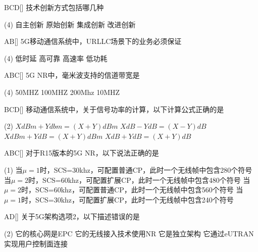 \begin{choice}{\;BCD\;}[]
    技术创新方式包括哪几种
    \begin{tasks}(4)
        \task 自主创新
        \task 原始创新
        \task 集成创新
        \task 改进创新
    \end{tasks}
\end{choice}


\begin{choice}{\;AB\;}[]
    5G移动通信系统中，URLLC场景下的业务必须保证
    \begin{tasks}(4)
        \task 低时延
        \task 高可靠
        \task 高速率
        \task 低功耗
    \end{tasks}
\end{choice}


\begin{choice}{\;ABC\;}[]
    5G NR中，毫米波支持的信道带宽是
    \begin{tasks}(4)
        \task 50MHZ
        \task 100MHZ
        \task 200Mhz
        \task 10MHZ
    \end{tasks}
\end{choice}


\begin{choice}{\;BCD\;}[]
    移动通信系统中，关于信号功率的计算，以下计算公式正确的是
    \begin{tasks}(2)
        \task $XdBm+Ydbm=(X+Y)dBm$
        \task $XdB-YdB=(X-Y)dB$
        \task $XdBm+YdB=(X+Y)dBm$
        \task $XdB+YdB=(X+Y)dB$
    \end{tasks}
\end{choice}


\begin{choice}{\;ABC\;}[]
    对于R15版本的5G NR，以下说法正确的是
    \begin{tasks}(1)
        \task 当$\mu =1$时，SCS=30khz，可配置普通CP，此时一个无线帧中包含280个符号
        \task 当$\mu =2$时，SCS=60khz，可配置扩展CP，此时一个无线帧中包含480个符号
        \task 当$\mu =2$时，SCS=60khz，可配置普通CP，此时一个无线帧中包含560个符号
        \task 当$\mu =1$时，SCS=30khz，可配置扩展CP，此时一个无线帧中包含240个符号
    \end{tasks}
\end{choice}


\begin{choice}{\;AD\;}[]
    关于5G架构选项2，以下描述错误的是
    \begin{tasks}(2)
        \task 它的核心网是EPC
        \task 它的无线接入技术使用NR
        \task 它是独立架构
        \task 它通过eUTRAN实现用户控制面连接
    \end{tasks}
\end{choice}


